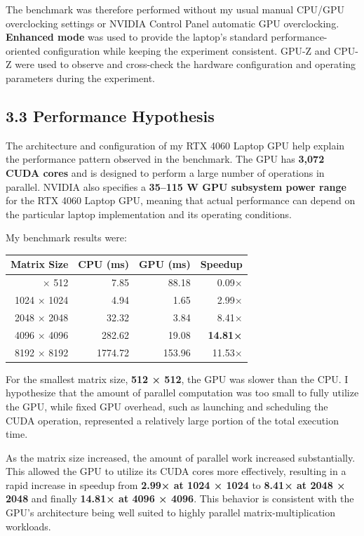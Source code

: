 \documentclass[11pt]{article}
\begin{document}
The benchmark was therefore performed without my usual manual CPU/GPU
overclocking settings or NVIDIA Control Panel automatic GPU
overclocking. \textbf{Enhanced mode} was used to provide the laptop's
standard performance-oriented configuration while keeping the experiment
consistent. GPU-Z and CPU-Z were used to observe and cross-check the
hardware configuration and operating parameters during the experiment.

\subsection{3.3 Performance Hypothesis}\label{performance-hypothesis}

The architecture and configuration of my RTX 4060 Laptop GPU help
explain the performance pattern observed in the benchmark. The GPU has
\textbf{3,072 CUDA cores} and is designed to perform a large number of
operations in parallel. NVIDIA also specifies a \textbf{35--115 W GPU
subsystem power range} for the RTX 4060 Laptop GPU, meaning that actual
performance can depend on the particular laptop implementation and its
operating conditions.

My benchmark results were:

{\def\LTcaptype{table} %
\begin{longtable}[]{@{}rrrr@{}}
\toprule\noalign{}
Matrix Size & CPU (ms) & GPU (ms) & Speedup \\
\midrule\noalign{}
\endhead
\bottomrule\noalign{}
\endlastfoot
512 × 512 & 7.85 & 88.18 & 0.09× \\
1024 × 1024 & 4.94 & 1.65 & 2.99× \\
2048 × 2048 & 32.32 & 3.84 & 8.41× \\
4096 × 4096 & 282.62 & 19.08 & \textbf{14.81×} \\
8192 × 8192 & 1774.72 & 153.96 & 11.53× \\
\end{longtable}
}

For the smallest matrix size, \textbf{512 × 512}, the GPU was slower
than the CPU. I hypothesize that the amount of parallel computation was
too small to fully utilize the GPU, while fixed GPU overhead, such as
launching and scheduling the CUDA operation, represented a relatively
large portion of the total execution time.

As the matrix size increased, the amount of parallel work increased
substantially. This allowed the GPU to utilize its CUDA cores more
effectively, resulting in a rapid increase in speedup from \textbf{2.99×
at 1024 × 1024} to \textbf{8.41× at 2048 × 2048} and finally
\textbf{14.81× at 4096 × 4096}. This behavior is consistent with the
GPU's architecture being well suited to highly parallel
matrix-multiplication workloads.
\end{document}
